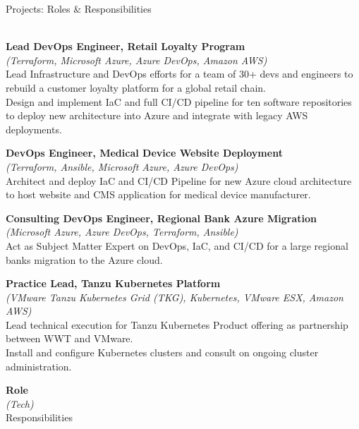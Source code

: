 \documentclass[letterpaper]{article}
\newcommand{\lineunder} {
    \vspace*{-8pt} \\
    \hspace*{-18pt} \hrulefill \\
}
\newcommand{\header} [1] {
    {\hspace*{-18pt}\vspace*{6pt} #1}
    \vspace*{-6pt} \lineunder
}
\begin{document}
\header{Projects: Roles \& Responsibilities} \nopagebreak

{\textbf{Lead DevOps Engineer, Retail Loyalty Program}} \nopagebreak \\
{\sl (Terraform, Microsoft Azure, Azure DevOps, Amazon AWS)} \nopagebreak \\
Lead Infrastructure and DevOps efforts for a team of 30+ devs and engineers to
  rebuild a customer loyalty platform for a global retail chain.\nopagebreak \\
Design and implement IaC and full CI/CD pipeline for ten software repositories
  to deploy new architecture into Azure and integrate with legacy AWS
  deployments.\\
\vspace*{2mm}

{\textbf{DevOps Engineer, Medical Device Website Deployment}} \nopagebreak \\
{\sl (Terraform, Ansible, Microsoft Azure, Azure DevOps)} \nopagebreak \\
Architect and deploy IaC and CI/CD Pipeline for new Azure cloud architecture
  to host website and CMS application for medical device manufacturer.\\
\vspace*{2mm}

{\textbf{Consulting DevOps Engineer, Regional Bank Azure Migration}} \nopagebreak \\
{\sl (Microsoft Azure, Azure DevOps, Terraform, Ansible)} \nopagebreak \\
Act as Subject Matter Expert on DevOps, IaC, and CI/CD for a large regional
  bank\textquotesingle{}s migration to the Azure cloud.\\
\vspace*{2mm}

{\textbf{Practice Lead, Tanzu Kubernetes Platform}} \nopagebreak \\
{\sl (VMware Tanzu Kubernetes Grid (TKG), Kubernetes, VMware ESX, Amazon AWS)} \nopagebreak \\
Lead technical execution for Tanzu Kubernetes Product offering as partnership
  between WWT and VMware.\nopagebreak \\
Install and configure Kubernetes clusters and consult on ongoing cluster
  administration.\\
\vspace*{2mm}

{\textbf{Role}} \nopagebreak \\
{\sl (Tech)} \nopagebreak \\
Responsibilities\\
\vspace*{2mm}
\end{document}

